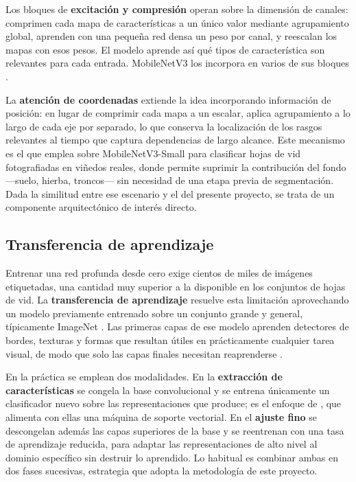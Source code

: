 Los bloques de \textbf{excitación y compresión} \citep{hu2018} operan sobre
la dimensión de canales: comprimen cada mapa de características a un único
valor mediante agrupamiento global, aprenden con una pequeña red densa un
peso por canal, y reescalan los mapas con esos pesos. El modelo aprende así
qué tipos de característica son relevantes para cada entrada. MobileNetV3
los incorpora en varios de sus bloques \citep{howard2019}.

La \textbf{atención de coordenadas} \citep{hou2021} extiende la idea
incorporando información de posición: en lugar de comprimir cada mapa a un
escalar, aplica agrupamiento a lo largo de cada eje por separado, lo que
conserva la localización de los rasgos relevantes al tiempo que captura
dependencias de largo alcance. Este mecanismo es el que emplea
\citet{deng2025} sobre MobileNetV3-Small para clasificar hojas de vid
fotografiadas en viñedos reales, donde permite suprimir la contribución del
fondo —suelo, hierba, troncos— sin necesidad de una etapa previa de
segmentación. Dada la similitud entre ese escenario y el del presente
proyecto, se trata de un componente arquitectónico de interés directo.

\subsection{Transferencia de aprendizaje}
\label{sec:transferencia}

Entrenar una red profunda desde cero exige cientos de miles de imágenes
etiquetadas, una cantidad muy superior a la disponible en los conjuntos de
hojas de vid. La \textbf{transferencia de aprendizaje} resuelve esta
limitación aprovechando un modelo previamente entrenado sobre un conjunto
grande y general, típicamente ImageNet \citep{deng2009}. Las primeras capas
de ese modelo aprenden detectores de bordes, texturas y formas que resultan
útiles en prácticamente cualquier tarea visual, de modo que solo las capas
finales necesitan reaprenderse \citep{yosinski2014}.

En la práctica se emplean dos modalidades. En la \textbf{extracción de
características} se congela la base convolucional y se entrena únicamente un
clasificador nuevo sobre las representaciones que produce; es el enfoque de
\citet{koklu2022}, que alimenta con ellas una máquina de soporte vectorial.
En el \textbf{ajuste fino} se descongelan además las capas superiores de la
base y se reentrenan con una tasa de aprendizaje reducida, para adaptar las
representaciones de alto nivel al dominio específico sin destruir lo
aprendido. Lo habitual es combinar ambas en dos fases sucesivas, estrategia
que adopta la metodología de este proyecto.

